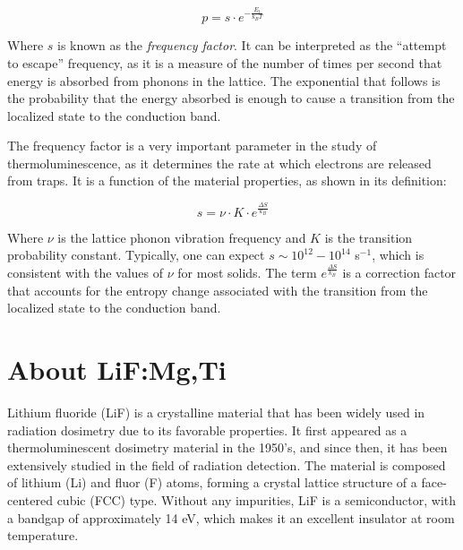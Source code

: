 \begin{equation}
  p = s \cdot e^{-\frac{E_t}{k_B T}}
\end{equation}

\vspace{10pt}
Where $s$ is known as the \textit{frequency factor}. It can be interpreted as the ``attempt to escape'' frequency, as it is a measure of the number of times per second that energy is absorbed from phonons in the lattice. The exponential that follows is the probability that the energy absorbed is enough to cause a transition from the localized state to the conduction band. 

\vspace{10pt}

The frequency factor is a very important parameter in the study of thermoluminescence, as it determines the rate at which electrons are released from traps. It is a function of the material properties, as shown in its definition:

\begin{equation}
  s = \nu \cdot K \cdot e^{\frac{\Delta S}{k_B}}
\end{equation}

\vspace{10pt}
Where $\nu$ is the lattice phonon vibration frequency and $K$ is the transition probability constant. Typically, one can expect $s \sim 10^{12} -10^{14}$ s$^{-1}$, which is consistent with the values of $\nu$ for most solids. The term $e^{\frac{\Delta S}{k_B}}$ is a correction factor that accounts for the entropy change associated with the transition from the localized state to the conduction band. 





















\section{About LiF:Mg,Ti} \label{sec:LiF}


Lithium fluoride (LiF) is a crystalline material that has been widely used in radiation dosimetry due to its favorable %
properties. It first appeared as a thermoluminescent dosimetry material in the 1950's, and since then, it has been extensively studied in the field of radiation detection. The material is composed of lithium (Li) and fluor (F) %
atoms, forming a crystal lattice structure of a face-centered cubic (FCC) type. Without any impurities, LiF is a semiconductor, with a bandgap of approximately 14 eV, which makes it an excellent insulator at room temperature.

